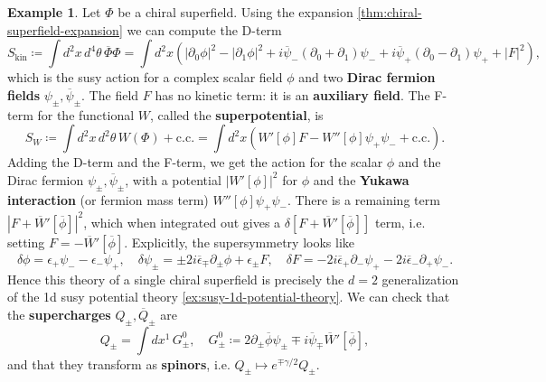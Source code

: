 \documentclass{report}
\theoremstyle{plain}
\theoremstyle{definition}
\newtheorem{example}[theorem]{Example}
\theoremstyle{remark}
\newcommand{\di}{\partial}
\newcommand{\cnj}{\overline}
\begin{document}
\begin{example} \label{ex:susy-chiral-superfield-theory}
  Let $\Phi$ be a chiral superfield. Using the expansion
  \ref{thm:chiral-superfield-expansion} we can compute the D-term
  \[ S_{\text{kin}} \coloneqq \int d^2 x \, d^4\theta \, \cnj\Phi\Phi = \int d^2x \left(|\di_0\phi|^2 - |\di_1\phi|^2 + i\cnj\psi_-(\di_0 + \di_1)\psi_- + i\cnj\psi_+(\di_0 - \di_1)\psi_+ + |F|^2\right), \]
  which is the susy action for a complex scalar field $\phi$ and two
  {\bf Dirac fermion fields} $\psi_\pm, \cnj \psi_\pm$. The field $F$
  has no kinetic term: it is an {\bf auxiliary field}. The F-term for
  the functional $W$, called the {\bf superpotential}, is
  \[ S_W \coloneqq \int d^2x \, d^2\theta \, W(\Phi) + \text{c.c.} = \int d^2x \left(W'[\phi]F - W''[\phi]\psi_+\psi_- + \text{c.c.}\right). \]
  Adding the D-term and the F-term, we get the action for the scalar
  $\phi$ and the Dirac fermion $\psi_\pm, \cnj \psi_\pm$, with a
  potential $|W'[\phi]|^2$ for $\phi$ and the {\bf Yukawa interaction}
  (or fermion mass term) $W''[\phi]\psi_+ \psi_-$. There is a
  remaining term $|F + \cnj W'[\cnj \phi]|^2$, which when integrated
  out gives a $\delta[F + \cnj W'[\cnj \phi]]$ term, i.e. setting $F =
  -\cnj W'[\cnj \phi]$. Explicitly, the supersymmetry looks like
  \[ \delta\phi = \epsilon_+ \psi_- - \epsilon_- \psi_+, \quad \delta \psi_\pm = \pm 2i\cnj \epsilon_\mp \di_\pm \phi + \epsilon_\pm F, \quad \delta F = -2i\cnj\epsilon_+ \di_- \psi_+ - 2i\cnj\epsilon_- \di_+ \psi_-. \]
  Hence this theory of a single chiral superfield is precisely the
  $d=2$ generalization of the 1d susy potential theory
  \ref{ex:susy-1d-potential-theory}. We can check that the {\bf
    supercharges} $Q_\pm, \cnj Q_\pm$ are
  \[ Q_\pm = \int dx^1 \, G^0_\pm, \quad G^0_\pm \coloneqq 2\di_\pm\cnj\phi \psi_\pm \mp i\cnj\psi_\mp \cnj W'[\cnj \phi], \]
  and that they transform as {\bf spinors}, i.e. $Q_\pm \mapsto e^{\mp
    \gamma/2} Q_\pm$.


\end{example}
\end{document}
